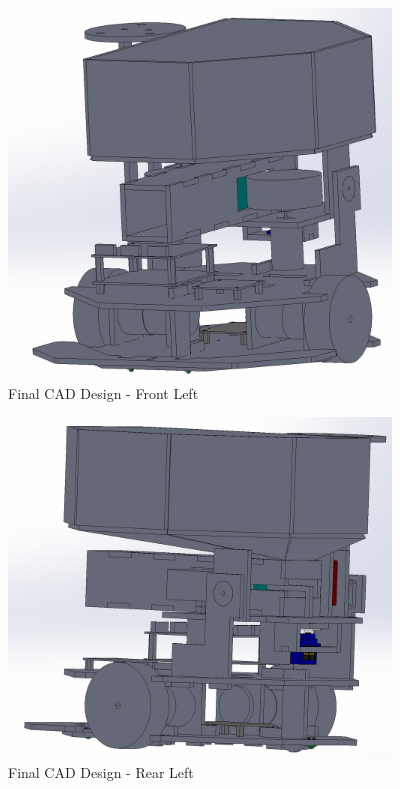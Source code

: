 \documentclass{article}
\begin{document}
\begin{figure}[H]
    \centering
    \includegraphics[width = 4in]{FinalCad2.PNG}
    \caption{Final CAD Design - Front Left}
    \label{fig:FinalCad2}
\end{figure}

\begin{figure}[H]
    \centering
    \includegraphics[width = 4in]{FinalCad3.PNG}
    \caption{Final CAD Design - Rear Left}
    \label{fig:FinalCad3}
\end{figure}
\end{document}
